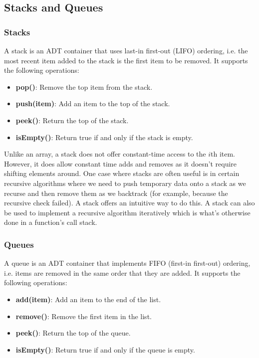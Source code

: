 \documentclass{article}
\begin{document}
    \subsection{Stacks and Queues}
    \subsubsection{Stacks}
    A stack is an ADT container that uses last-in first-out (LIFO) ordering, i.e. the most recent item added to the stack is the first item to be removed. It supports the following operations:
    \begin{itemize}
        \item  \textbf{pop()}: Remove the top item from the stack.
        \item  \textbf{push(item)}: Add an item to the top of the stack.
        \item \textbf{peek()}: Return the top of the stack.
        \item \textbf{isEmpty()}: Return true if and only if the stack is empty.
    \end{itemize}
    Unlike an array, a stack does not offer constant-time access to the $i$th item. However, it does allow constant time adds and removes as it doesn't require shifting elements around. One case where stacks are often useful is in certain recursive algorithms where we need to push temporary data onto a stack as we recurse and then remove them as we backtrack (for example, because the recursive check failed). A stack offers an intuitive way to do this. A stack can also be used to implement a recursive algorithm iteratively which is what's otherwise done in a function's call stack.
    
    \subsubsection{Queues}
    A queue is an ADT container that implements FIFO (first-in first-out) ordering, i.e. items are removed in the same order that they are added. It supports the following operations: 
    \begin{itemize}
        \item \textbf{add(item)}: Add an item to the end of the list.
        \item \textbf{remove()}: Remove the first item in the list.
        \item \textbf{peek()}: Return the top of the queue.
        \item \textbf{isEmpty()}: Return true if and only if the queue is empty. 
    \end{itemize}
    
\end{document}
